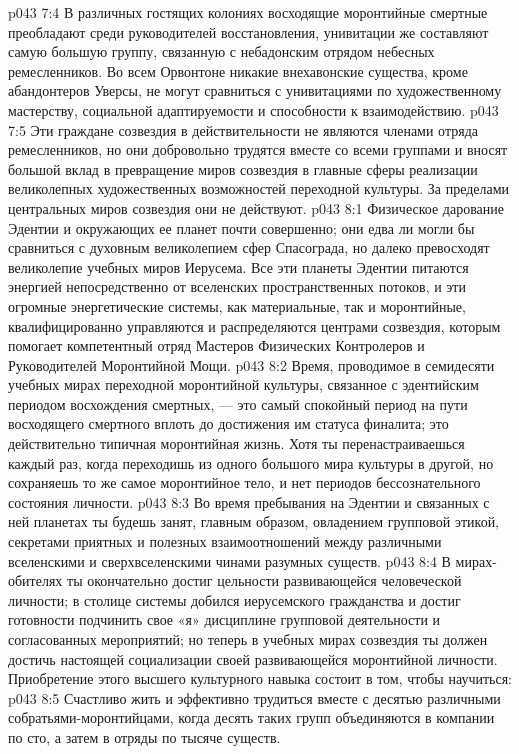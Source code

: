 \vs p043 7:4 В различных гостящих колониях восходящие моронтийные смертные преобладают среди руководителей восстановления, унивитации же составляют самую большую группу, связанную с небадонским отрядом небесных ремесленников. Во всем Орвонтоне никакие внехавонские существа, кроме абандонтеров Уверсы, не могут сравниться с унивитациями по художественному мастерству, социальной адаптируемости и способности к взаимодействию.
\vs p043 7:5 Эти граждане созвездия в действительности не являются членами отряда ремесленников, но они добровольно трудятся вместе со всеми группами и вносят большой вклад в превращение миров созвездия в главные сферы реализации великолепных художественных возможностей переходной культуры. За пределами центральных миров созвездия они не действуют.
\vs p043 8:1 Физическое дарование Эдентии и окружающих ее планет почти совершенно; они едва ли могли бы сравниться с духовным великолепием сфер Спасограда, но далеко превосходят великолепие учебных миров Иерусема. Все эти планеты Эдентии питаются энергией непосредственно от вселенских пространственных потоков, и эти огромные энергетические системы, как материальные, так и моронтийные, квалифицированно управляются и распределяются центрами созвездия, которым помогает компетентный отряд Мастеров Физических Контролеров и Руководителей Моронтийной Мощи.
\vs p043 8:2 Время, проводимое в семидесяти учебных мирах переходной моронтийной культуры, связанное с эдентийским периодом восхождения смертных, --- это самый спокойный период на пути восходящего смертного вплоть до достижения им статуса финалита; это действительно типичная моронтийная жизнь. Хотя ты перенастраиваешься каждый раз, когда переходишь из одного большого мира культуры в другой, но сохраняешь то же самое моронтийное тело, и нет периодов бессознательного состояния личности.
\vs p043 8:3 Во время пребывания на Эдентии и связанных с ней планетах ты будешь занят, главным образом, овладением групповой этикой, секретами приятных и полезных взаимоотношений между различными вселенскими и сверхвселенскими чинами разумных существ.
\vs p043 8:4 В мирах\hyp{}обителях ты окончательно достиг цельности развивающейся человеческой личности; в столице системы добился иерусемского гражданства и достиг готовности подчинить свое «я» дисциплине групповой деятельности и согласованных мероприятий; но теперь в учебных мирах созвездия ты должен достичь настоящей социализации своей развивающейся моронтийной личности. Приобретение этого высшего культурного навыка состоит в том, чтобы научиться:
\vs p043 8:5 \bibnobreakspace Счастливо жить и эффективно трудиться вместе с десятью различными собратьями\hyp{}моронтийцами, когда десять таких групп объединяются в компании по сто, а затем в отряды по тысяче существ.

